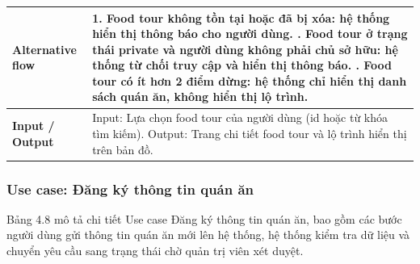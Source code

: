 \begin{longtable}{|p{4cm}|p{10cm}|}
\textbf{Alternative flow} &
1. Food tour không tồn tại hoặc đã bị xóa: hệ thống hiển thị thông báo cho người dùng. \newline 2. Food tour ở trạng thái private và người dùng không phải chủ sở hữu: hệ thống từ chối truy cập và hiển thị thông báo. \newline 3. Food tour có ít hơn 2 điểm dừng: hệ thống chỉ hiển thị danh sách quán ăn, không hiển thị lộ trình. \\
\hline

\textbf{Input / Output} &
Input: Lựa chọn food tour của người dùng (id hoặc từ khóa tìm kiếm). \newline Output: Trang chi tiết food tour và lộ trình hiển thị trên bản đồ. \\
\hline

\end{longtable}
\endgroup

\begingroup
\subsubsection{Use case: Đăng ký thông tin quán ăn}

Bảng 4.8 mô tả chi tiết Use case Đăng ký thông tin quán ăn,
bao gồm các bước người dùng gửi thông tin quán ăn mới lên hệ thống, hệ thống kiểm tra dữ liệu
và chuyển yêu cầu sang trạng thái chờ quản trị viên xét duyệt.

